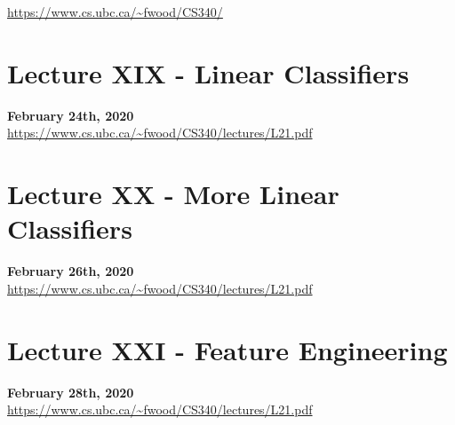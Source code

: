 \documentclass{article}
\theoremstyle{definition}
\begin{document}
\noindent \url{https://www.cs.ubc.ca/~fwood/CS340/}

\section*{Lecture XIX - Linear Classifiers}
\textbf{February 24th, 2020} \\
\url{https://www.cs.ubc.ca/~fwood/CS340/lectures/L21.pdf}

\newpage

\section*{Lecture XX - More Linear Classifiers}
\textbf{February 26th, 2020} \\
\url{https://www.cs.ubc.ca/~fwood/CS340/lectures/L21.pdf}

\newpage

\section*{Lecture XXI - Feature Engineering}
\textbf{February 28th, 2020} \\
\url{https://www.cs.ubc.ca/~fwood/CS340/lectures/L21.pdf}
\end{document}
